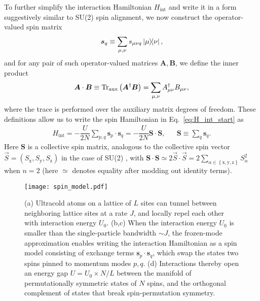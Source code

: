 \documentclass[nofootinbib,twocolumn]{revtex4-2}
\renewcommand{\t}{\text} %
\newcommand{\f}[2]{\dfrac{#1}{#2}} %
\newcommand{\p}[1]{\left(#1\right)} %
\renewcommand{\set}[1]{\left\{#1\right\}} %
\renewcommand{\v}{\bm} %
\renewcommand{\c}{\cdot} %
\newcommand{\1}{\mathds{1}}
\newcommand{\x}{\text{x}}
\newcommand{\y}{\text{y}}
\newcommand{\z}{\text{z}}
\begin{document}
To further simplify the interaction Hamiltonian $H_{\t{int}}$ and write it in a form suggestively similar to SU(2) spin alignment, we now construct the operator-valued spin matrix
\begin{align}
  \v s_q \equiv \sum_{\mu,\nu} s_{\mu\nu q} \op{\mu}{\nu},
\end{align}
and for any pair of such operator-valued matrices $\v A,\v B$, we define the inner product
\begin{align}
  \v A \c \v B \equiv \Tr_{\t{aux}}\p{\v A^\dag\v B}
  = \sum_{\mu,\nu} A_{\mu\nu}^\dag B_{\mu\nu},
  \label{eq:dot_product}
\end{align}
where the trace is performed over the auxiliary matrix degrees of freedom.
These definitions allow us to write the spin Hamiltonian in Eq.~\eqref{eq:H_int_start} as
\begin{align}
  H_{\t{int}} = -\f{U}{2N} \sum_{p,q} \v s_p\c\v s_q
  = -\f{U}{2N}\v S\c\v S,
  &&
  \v S \equiv \sum_q \v s_q.
  \label{eq:H_int}
\end{align}
Here $\v S$ is a collective spin matrix, analogous to the collective spin vector $\vec S=\p{S_\x,S_\y,S_\z}$ in the case of SU(2) \cite{he2019engineering}, with $\v S\c\v S \simeq 2 \vec S\c\vec S = 2 \sum_{\alpha\in\set{\x,\y,\z}}S_\alpha^2$ when $n=2$ (here $\simeq$ denotes equality after modding out identity terms).

\begin{figure}
\centering
\texttt{[image: spin\_model.pdf]}
\caption{
(a) Ultracold atoms on a lattice of $L$ sites can tunnel between neighboring lattice sites at a rate $J$, and locally repel each other with interaction energy $U_0$.
(b,c) When the interaction energy $U_0$ is smaller than the single-particle bandwidth $\sim J$, the frozen-mode approximation enables writing the interaction Hamiltonian as a spin model consisting of exchange terms $\v s_p\c\v s_q$, which swap the states two spins pinned to momentum modes $p,q$.
(d) Interactions thereby open an energy gap $U=U_0\times N/L$ between the manifold of permutationally symmetric states of $N$ spins, and the orthogonal complement of states that break spin-permutation symmetry.
}
\label{fig:spin_model}
\end{figure}
\end{document}
